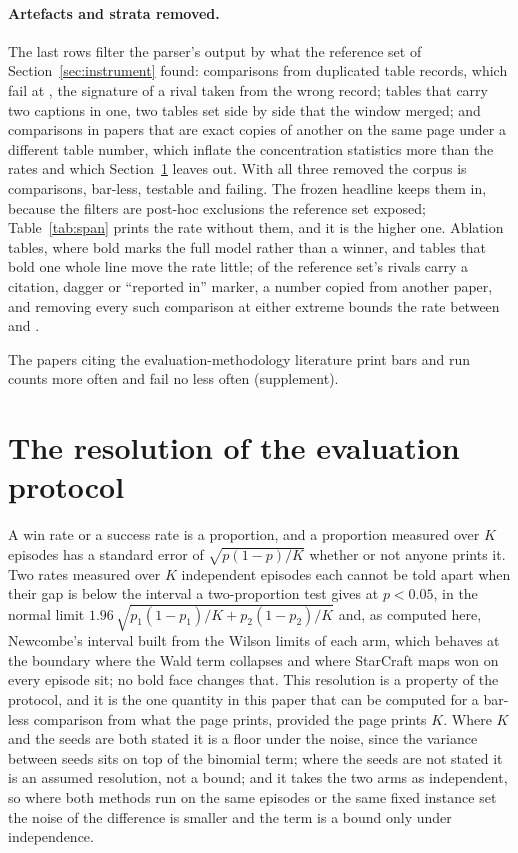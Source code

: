 \documentclass[sigconf,anonymous]{aamas}
\begin{document}
\paragraph{Artefacts and strata removed.} The last rows filter the parser's
output by what the reference set of Section~\ref{sec:instrument} found:
\nRDupOnlyN{} comparisons from duplicated table records, which fail at
\nRDupOnlyFail{}, the signature of a rival taken from the wrong record;
\nRMergedTables{} tables that carry two captions in one, two tables set
side by side that the window merged; and \nRCopiesOnlyN{} comparisons in
\nRCopiesPapers{} papers that are exact copies of another on the same
page under a different table number, which inflate the concentration
statistics more than the rates and which Section~\ref{sec:protocol}
leaves out. With all three removed the corpus is
\nRAllArtefactsRemovedN{} comparisons, \nRAllArtefactsRemovedNeither{}
bar-less, \nRAllArtefactsRemovedTestable{} testable and
\nRAllArtefactsRemovedFail{} failing. The frozen headline keeps them in,
because the filters are post-hoc exclusions the reference set exposed;
Table~\ref{tab:span} prints the rate without them, and it is the higher
one. Ablation tables, where bold marks the full model rather than a
winner, and tables that bold one whole line move the rate little;
\nGRivalCopied{} of the reference set's rivals carry a citation, dagger
or ``reported in'' marker, a number copied from another paper, and
removing every such comparison at either extreme bounds the rate between
\nFailCopiedRemovedLow{} and \nFailCopiedRemovedHigh{}.

The \nCcCitingPapers{} papers citing the evaluation-methodology literature
print bars and run counts more often and fail no less often (supplement).

\section{The resolution of the evaluation protocol}
\label{sec:protocol}

A win rate or a success rate is a proportion, and a proportion measured over
$K$ episodes has a standard error of $\sqrt{p(1-p)/K}$ whether or not anyone
prints it. Two rates measured over $K$ independent episodes each cannot be
told apart when their gap is below the interval a two-proportion test
gives at $p < 0.05$, in the normal limit
$1.96\,\sqrt{p_1(1-p_1)/K + p_2(1-p_2)/K}$ and, as computed here,
Newcombe's interval built from the Wilson limits of each arm, which
behaves at the boundary where the Wald term collapses and where StarCraft
maps won on every episode sit; no bold face changes that. This resolution
is a property of the protocol, and it is the one quantity in this paper
that can be computed for a bar-less comparison from what the page prints,
provided the page prints $K$. Where $K$ and the seeds are both stated it
is a floor under the noise, since the variance between seeds sits on top
of the binomial term; where the seeds are not stated it is an assumed
resolution, not a bound; and it takes the two arms as independent, so
where both methods run on the same episodes or the same fixed instance
set the noise of the difference is smaller and the term is a bound only
under independence.
\end{document}
